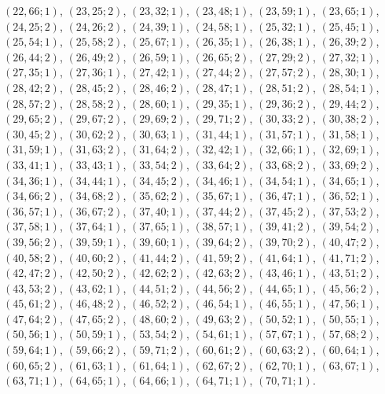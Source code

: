 \documentclass[11pt]{article}
\begin{document}
$(22,66;1)$, $(23,25;2)$, $(23,32;1)$, $(23,48;1)$, $(23,59;1)$, $(23,65;1)$, $(24,25;2)$, $(24,26;2)$, $(24,39;1)$, $(24,58;1)$, $(25,32;1)$, $(25,45;1)$, $(25,54;1)$, $(25,58;2)$, $(25,67;1)$, $(26,35;1)$, $(26,38;1)$, $(26,39;2)$, $(26,44;2)$, $(26,49;2)$, $(26,59;1)$, $(26,65;2)$, $(27,29;2)$, $(27,32;1)$, $(27,35;1)$, $(27,36;1)$, $(27,42;1)$, $(27,44;2)$, $(27,57;2)$, $(28,30;1)$, $(28,42;2)$, $(28,45;2)$, $(28,46;2)$, $(28,47;1)$, $(28,51;2)$, $(28,54;1)$, $(28,57;2)$, $(28,58;2)$, $(28,60;1)$, $(29,35;1)$, $(29,36;2)$, $(29,44;2)$, $(29,65;2)$, $(29,67;2)$, $(29,69;2)$, $(29,71;2)$, $(30,33;2)$, $(30,38;2)$, $(30,45;2)$, $(30,62;2)$, $(30,63;1)$, $(31,44;1)$, $(31,57;1)$, $(31,58;1)$, $(31,59;1)$, $(31,63;2)$, $(31,64;2)$, $(32,42;1)$, $(32,66;1)$, $(32,69;1)$, $(33,41;1)$, $(33,43;1)$, $(33,54;2)$, $(33,64;2)$, $(33,68;2)$, $(33,69;2)$, $(34,36;1)$, $(34,44;1)$, $(34,45;2)$, $(34,46;1)$, $(34,54;1)$, $(34,65;1)$, $(34,66;2)$, $(34,68;2)$, $(35,62;2)$, $(35,67;1)$, $(36,47;1)$, $(36,52;1)$, $(36,57;1)$, $(36,67;2)$, $(37,40;1)$, $(37,44;2)$, $(37,45;2)$, $(37,53;2)$, $(37,58;1)$, $(37,64;1)$, $(37,65;1)$, $(38,57;1)$, $(39,41;2)$, $(39,54;2)$, $(39,56;2)$, $(39,59;1)$, $(39,60;1)$, $(39,64;2)$, $(39,70;2)$, $(40,47;2)$, $(40,58;2)$, $(40,60;2)$, $(41,44;2)$, $(41,59;2)$, $(41,64;1)$, $(41,71;2)$, $(42,47;2)$, $(42,50;2)$, $(42,62;2)$, $(42,63;2)$, $(43,46;1)$, $(43,51;2)$, $(43,53;2)$, $(43,62;1)$, $(44,51;2)$, $(44,56;2)$, $(44,65;1)$, $(45,56;2)$, $(45,61;2)$, $(46,48;2)$, $(46,52;2)$, $(46,54;1)$, $(46,55;1)$, $(47,56;1)$, $(47,64;2)$, $(47,65;2)$, $(48,60;2)$, $(49,63;2)$, $(50,52;1)$, $(50,55;1)$, $(50,56;1)$, $(50,59;1)$, $(53,54;2)$, $(54,61;1)$, $(57,67;1)$, $(57,68;2)$, $(59,64;1)$, $(59,66;2)$, $(59,71;2)$, $(60,61;2)$, $(60,63;2)$, $(60,64;1)$, $(60,65;2)$, $(61,63;1)$, $(61,64;1)$, $(62,67;2)$, $(62,70;1)$, $(63,67;1)$, $(63,71;1)$, $(64,65;1)$, $(64,66;1)$, $(64,71;1)$, $(70,71;1)$.
\end{document}
